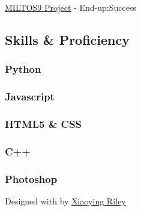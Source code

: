 \documentclass[english,]{article}
\begin{document}
{
\href{https://github.com/Miltos9/hci/tree/2015143/projects/2015143}{MILTOS9
Project} } - {End-up:Success}

\hypertarget{skills-proficiency}{%
\subsection{\texorpdfstring{{ \emph{} \emph{} } Skills \&
Proficiency}{    Skills \& Proficiency}}\label{skills-proficiency}}

\hypertarget{python}{%
\subsubsection{Python}\label{python}}

\hypertarget{javascript}{%
\subsubsection{Javascript}\label{javascript}}

\hypertarget{html5-css}{%
\subsubsection{HTML5 \& CSS}\label{html5-css}}

\hypertarget{c}{%
\subsubsection{C++}\label{c}}

\hypertarget{photoshop}{%
\subsubsection{Photoshop}\label{photoshop}}

{Designed with \emph{} by \href{http://themes.3rdwavemedia.com}{Xiaoying
Riley}}
\end{document}
